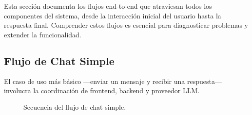Esta sección documenta los flujos end-to-end que atraviesan todos los componentes del sistema, desde la interacción inicial del usuario hasta la respuesta final. Comprender estos flujos es esencial para diagnosticar problemas y extender la funcionalidad.

\subsection{Flujo de Chat Simple}

El caso de uso más básico ---enviar un mensaje y recibir una respuesta--- involucra la coordinación de frontend, backend y proveedor LLM.

\begin{figure}[H]
    \centering
    \caption{Secuencia del flujo de chat simple.}
    \label{fig:chat_flow}
\end{figure}

